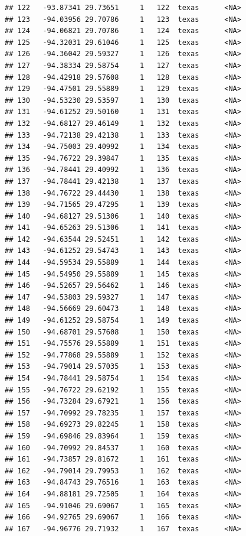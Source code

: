 \documentclass[
]{article}
\begin{document}
\begin{verbatim}
## 122   -93.87341 29.73651     1   122  texas      <NA>
## 123   -94.03956 29.70786     1   123  texas      <NA>
## 124   -94.06821 29.70786     1   124  texas      <NA>
## 125   -94.32031 29.61046     1   125  texas      <NA>
## 126   -94.36042 29.59327     1   126  texas      <NA>
## 127   -94.38334 29.58754     1   127  texas      <NA>
## 128   -94.42918 29.57608     1   128  texas      <NA>
## 129   -94.47501 29.55889     1   129  texas      <NA>
## 130   -94.53230 29.53597     1   130  texas      <NA>
## 131   -94.61252 29.50160     1   131  texas      <NA>
## 132   -94.68127 29.46149     1   132  texas      <NA>
## 133   -94.72138 29.42138     1   133  texas      <NA>
## 134   -94.75003 29.40992     1   134  texas      <NA>
## 135   -94.76722 29.39847     1   135  texas      <NA>
## 136   -94.78441 29.40992     1   136  texas      <NA>
## 137   -94.78441 29.42138     1   137  texas      <NA>
## 138   -94.76722 29.44430     1   138  texas      <NA>
## 139   -94.71565 29.47295     1   139  texas      <NA>
## 140   -94.68127 29.51306     1   140  texas      <NA>
## 141   -94.65263 29.51306     1   141  texas      <NA>
## 142   -94.63544 29.52451     1   142  texas      <NA>
## 143   -94.61252 29.54743     1   143  texas      <NA>
## 144   -94.59534 29.55889     1   144  texas      <NA>
## 145   -94.54950 29.55889     1   145  texas      <NA>
## 146   -94.52657 29.56462     1   146  texas      <NA>
## 147   -94.53803 29.59327     1   147  texas      <NA>
## 148   -94.56669 29.60473     1   148  texas      <NA>
## 149   -94.61252 29.58754     1   149  texas      <NA>
## 150   -94.68701 29.57608     1   150  texas      <NA>
## 151   -94.75576 29.55889     1   151  texas      <NA>
## 152   -94.77868 29.55889     1   152  texas      <NA>
## 153   -94.79014 29.57035     1   153  texas      <NA>
## 154   -94.78441 29.58754     1   154  texas      <NA>
## 155   -94.76722 29.62192     1   155  texas      <NA>
## 156   -94.73284 29.67921     1   156  texas      <NA>
## 157   -94.70992 29.78235     1   157  texas      <NA>
## 158   -94.69273 29.82245     1   158  texas      <NA>
## 159   -94.69846 29.83964     1   159  texas      <NA>
## 160   -94.70992 29.84537     1   160  texas      <NA>
## 161   -94.73857 29.81672     1   161  texas      <NA>
## 162   -94.79014 29.79953     1   162  texas      <NA>
## 163   -94.84743 29.76516     1   163  texas      <NA>
## 164   -94.88181 29.72505     1   164  texas      <NA>
## 165   -94.91046 29.69067     1   165  texas      <NA>
## 166   -94.92765 29.69067     1   166  texas      <NA>
## 167   -94.96776 29.71932     1   167  texas      <NA>

\end{verbatim}
\end{document}
